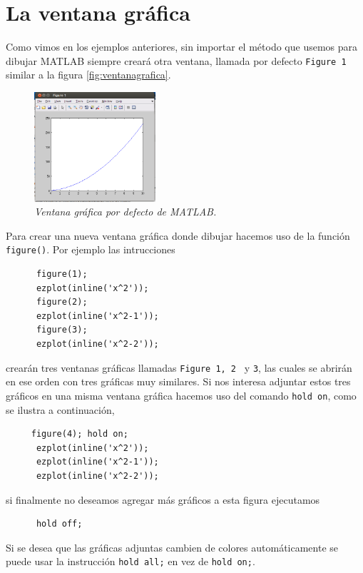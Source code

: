 \documentclass[11pt]{article}
\begin{document}
    \section{La ventana gr\'afica}
      Como vimos en los ejemplos anteriores, sin importar el m\'etodo que usemos para dibujar MATLAB siempre 
      crear\'a otra ventana, llamada por defecto \texttt{Figure 1} similar a la figura \eqref{fig:ventanagrafica}. 
      \begin{figure}[htp]
      \begin{center}
      \includegraphics[width=0.4\textwidth]{./ventanafigure.png}
      \caption{\sl Ventana gr\'afica por defecto de MATLAB.}
      \label{fig:ventanagrafica}
      \end{center}
      \end{figure}
     Para crear una nueva ventana gr\'afica donde dibujar hacemos uso de la funci\'on \texttt{figure()}. Por 
     ejemplo las intrucciones
     \begin{verbatim}
      figure(1);
      ezplot(inline('x^2'));
      figure(2);
      ezplot(inline('x^2-1'));
      figure(3);
      ezplot(inline('x^2-2'));
     \end{verbatim}
     crear\'an tres ventanas gr\'aficas llamadas \texttt{Figure 1, 2 } y \texttt{3}, las cuales se abrir\'an 
     en ese orden con tres gr\'aficas muy similares.
     Si nos interesa adjuntar estos tres gr\'aficos en una misma ventana gr\'afica hacemos uso del 
     comando \texttt{hold on}, como se ilustra a continuaci\'on,
     \begin{verbatim}
     figure(4); hold on;
      ezplot(inline('x^2'));
      ezplot(inline('x^2-1'));
      ezplot(inline('x^2-2'));
     \end{verbatim}
     si finalmente no deseamos agregar m\'as gr\'aficos a esta figura ejecutamos 
     \begin{verbatim}
      hold off;
     \end{verbatim}  
     Si se desea que las gr\'aficas adjuntas cambien de colores autom\'aticamente se puede usar la instrucci\'on \texttt{hold all;} en vez de \texttt{hold on;}.
     
\end{document}
